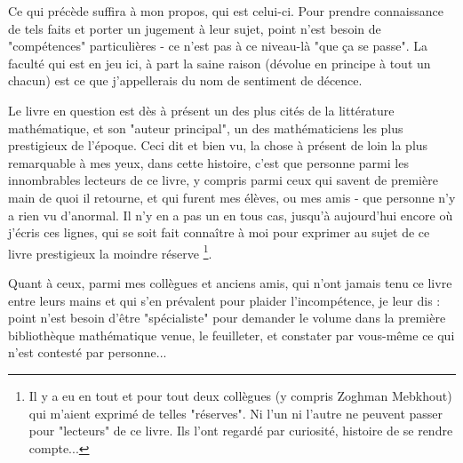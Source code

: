 Ce qui précède suffira à mon propos, qui est celui-ci. Pour prendre connaissance de tels faits et porter un jugement à leur sujet, point n'est besoin de "compétences" particulières - ce n'est pas à ce niveau-là "que ça se passe". La faculté qui est en jeu ici, à part la saine raison (dévolue en principe à tout un chacun) est ce que j'appellerais du nom de sentiment de décence.

Le livre en question est dès à présent un des plus cités de la littérature mathématique, et son "auteur principal", un des mathématiciens les plus prestigieux de l'époque. Ceci dit et bien vu, la chose à présent de loin la plus remarquable à mes yeux, dans cette histoire, c'est que personne parmi les innombrables lecteurs de ce livre, y compris parmi ceux qui savent de première main de quoi il retourne, et qui furent mes élèves, ou mes amis - que personne n'y a rien vu d'anormal. Il n'y en a pas un en tous cas, jusqu'à aujourd'hui encore où j'écris ces lignes, qui se soit fait connaître à moi pour exprimer au sujet de ce livre prestigieux la moindre réserve \footnote{Il y a eu en tout et pour tout deux collègues (y compris Zoghman Mebkhout) qui m'aient exprimé de telles "réserves". Ni l'un ni l'autre ne peuvent passer pour "lecteurs" de ce livre. Ils l'ont regardé par curiosité, histoire de se rendre compte...}.

Quant à ceux, parmi mes collègues et anciens amis, qui n'ont jamais tenu ce livre entre leurs mains et qui s'en prévalent pour plaider l'incompétence, je leur dis : point n'est besoin d'être "spécialiste" pour demander le volume dans la première bibliothèque mathématique venue, le feuilleter, et constater par vous-même ce qui n'est contesté par personne...

